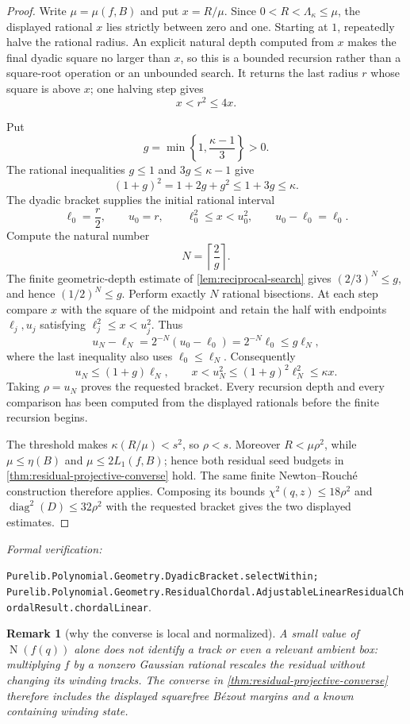\documentclass[11pt]{article}
\newtheorem{remark}[theorem]{Remark}
\newcommand{\Norm}[1]{\operatorname{N}\!\left(#1\right)}
\newcommand{\diamq}{\operatorname{diag}^{2}}
\newcommand{\leanref}[1]{\par\smallskip\noindent
  \emph{Formal verification:}\par\nobreak
  {\raggedright\nolinkurl{#1}.\par}}
\begin{document}
\begin{proof}
Write $\mu=\mu(f,B)$ and put $x=R/\mu$.  Since
$0<R<\Lambda_\kappa\le\mu$, the displayed
rational $x$ lies strictly between zero and one.  Starting at $1$, repeatedly
halve the rational radius.  An explicit natural depth computed from $x$ makes the
final dyadic square no larger than $x$, so this is a bounded recursion rather
than a square-root operation or an unbounded search.  It returns the last
radius $r$ whose square is above $x$; one halving step gives
\[
                         x<r^2\le4x.
\]

Put
\[
              g=\min\left\{1,\frac{\kappa-1}{3}\right\}>0.
\]
The rational inequalities $g\le1$ and $3g\le\kappa-1$ give
\[
              (1+g)^2=1+2g+g^2\le1+3g\le\kappa.
\]
The dyadic bracket supplies the initial rational interval
\[
 \ell_0=\frac r2,\qquad u_0=r,\qquad
 \ell_0^2\le x<u_0^2,\qquad u_0-\ell_0=\ell_0.
\]
Compute the natural number
\[
             N=\left\lceil\frac2g\right\rceil.
\]
The finite geometric-depth estimate of \cref{lem:reciprocal-search} gives
$(2/3)^N\le g$, and hence $(1/2)^N\le g$.  Perform exactly $N$ rational
bisections.  At each step compare $x$ with the square of the midpoint and
retain the half with endpoints $\ell_j,u_j$ satisfying
$\ell_j^2\le x<u_j^2$.  Thus
\[
 u_N-\ell_N
   =2^{-N}(u_0-\ell_0)
   =2^{-N}\ell_0
   \le g\ell_N,
\]
where the last inequality also uses $\ell_0\le\ell_N$.  Consequently
\[
 u_N\le(1+g)\ell_N,
 \qquad
 x<u_N^2\le(1+g)^2\ell_N^2\le\kappa x.
\]
Taking $\rho=u_N$ proves the requested bracket.  Every recursion depth and
every comparison has been computed from the displayed rationals before the
finite recursion begins.

The threshold makes $\kappa(R/\mu)<s^2$, so $\rho<s$.  Moreover
$R<\mu\rho^2$, while $\mu\le\eta(B)$ and
$\mu\le2L_1(f,B)$; hence both residual seed budgets in
\cref{thm:residual-projective-converse} hold.  The same finite
Newton--Rouch\'e construction therefore applies.  Composing its bounds
$\chi^2(q,z)\le18\rho^2$ and $\diamq(D)\le32\rho^2$ with the requested
bracket gives the two displayed estimates.
\end{proof}

\leanref{Purelib.Polynomial.Geometry.DyadicBracket.selectWithin;
Purelib.Polynomial.Geometry.ResidualChordal.AdjustableLinearResidualChordalResult.chordalLinear}

\begin{remark}[why the converse is local and normalized]
A small value of $\Norm{f(q)}$ alone does not identify a track or even a
relevant ambient box: multiplying $f$ by a nonzero Gaussian rational rescales
the residual without changing its winding tracks.  The converse in
\cref{thm:residual-projective-converse} therefore includes the displayed
squarefree Bézout margins and a known containing winding state.
\end{remark}
\end{document}

